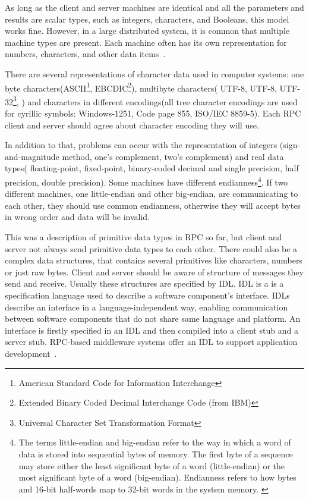 As long as the client and server machines are identical and all the parameters
and results are scalar types, such as integers, characters, and Booleans, this model
works fine. 
However, in a large distributed system, it is common that multiple
machine types are present.
Each machine often has its own representation for
numbers, characters, and other data items~\cite{tanenbaum07}.

There are several representations of character data used in computer systems:
one byte characters(ASCII\footnote{ American Standard Code for Information
Interchange}, EBCDIC\footnote{Extended Binary Coded Decimal Interchange Code
(from IBM)}), multibyte characters( UTF-8, UTF-8, UTF-32\footnote{Universal
Character Set Transformation Format},  ) and characters in different
encodings(all tree character encodings are used for cyrillic symbols: 
Windows-1251, Code page 855, ISO/IEC 8859-5). Each RPC client and server should
agree about character encoding they will use.

In addition to that, problems can occur with the representation of integers
(sign-and-magnitude method, one’s complement, two’s complement) and
real data types( floating-point, fixed-point, binary-coded decimal and single
precision, half precision, double precision). Some machines have different
endianness\footnote{The terms little-endian and big-endian refer to the way in which a word of data is stored into sequential bytes of
memory. The first byte of a sequence may store either the least significant byte of a word (little-endian) or the most
significant byte of a word (big-endian). Endianness refers to how bytes and
16-bit half-words map to 32-bit words in the system memory. \cite{arm_endian}}.
If two different machines, one little-endian and other big-endian, are
communicating to each other, they should use common endianness, otherwise they
will accept bytes in wrong order and data will be invalid.

This was a description of primitive data types in RPC so far, but client and
server not always send primitive data types to each other. There could also be a
complex data structures, that contains several primitives like characters,
numbers or just raw bytes. Client and server should be aware of structure of
messages they send and receive. Usually these structures are specified by
\gls{IDL}.
IDL is a  is a specification language used to describe a software component's interface.
IDLs describe an interface in a language-independent way, enabling
communication between software components that do not share same language and
platform.
An interface is firstly specified in an IDL and then compiled into a
client stub and a server stub. RPC-based middleware systems
offer an IDL to support application development~\cite{tanenbaum07}.

